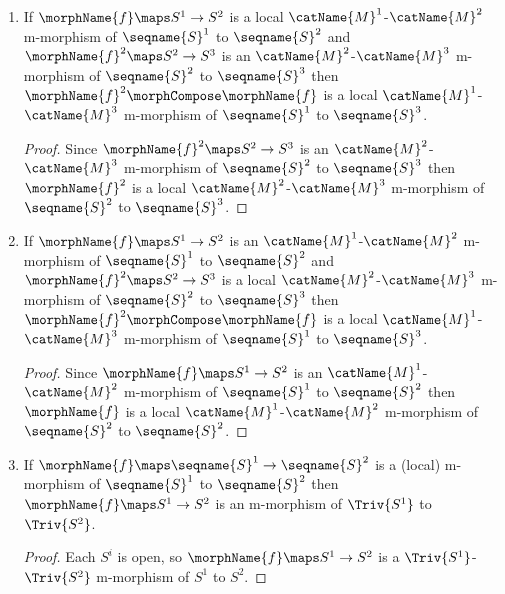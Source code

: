 \documentclass{article}
\begin{document}
\begin{corollary}
\begin{enumerate}
\begin{proof}
Since $\morphName{f} \maps S^1 \to S^2$ is an m-morphism of
$\seqname{S}^1$ to $\seqname{S}^2$ then $\morphName{f}$ is a local
m-morphism of $\seqname{S}^2$ to $\seqname{S}^2$.
\end{proof}

\item
If $\morphName{f} \maps S^1 \to S^2$ is a local
$\catName{M}^1$-$\catName{M}^2$ m-morphism of $\seqname{S}^1$ to
$\seqname{S}^2$ and $\morphName{f}^2 \maps S^2 \to S^3$ is an
$\catName{M}^2$-$\catName{M}^3$ m-morphism of $\seqname{S}^2$ to
$\seqname{S}^3$ then $\morphName{f}^2 \morphCompose \morphName{f}$ is a local
$\catName{M}^1$-$\catName{M}^3$ m-morphism of $\seqname{S}^1$ to
$\seqname{S}^3$.

\begin{proof}
Since $\morphName{f}^2 \maps S^2 \to S^3$ is an
$\catName{M}^2$-$\catName{M}^3$ m-morphism of $\seqname{S}^2$ to
$\seqname{S}^3$ then $\morphName{f}^2$ is a local
$\catName{M}^2$-$\catName{M}^3$ m-morphism of $\seqname{S}^2$ to
$\seqname{S}^3$.
\end{proof}

\item
If $\morphName{f} \maps S^1 \to S^2$ is an
$\catName{M}^1$-$\catName{M}^2$ m-morphism of $\seqname{S}^1$ to
$\seqname{S}^2$ and $\morphName{f}^2 \maps S^2 \to S^3$ is a local
$\catName{M}^2$-$\catName{M}^3$ m-morphism of $\seqname{S}^2$ to
$\seqname{S}^3$ then $\morphName{f}^2 \morphCompose \morphName{f}$ is a local
$\catName{M}^1$-$\catName{M}^3$ m-morphism of $\seqname{S}^1$ to
$\seqname{S}^3$.

\begin{proof}
Since $\morphName{f} \maps S^1 \to S^2$ is an
$\catName{M}^1$-$\catName{M}^2$ m-morphism of $\seqname{S}^1$ to
$\seqname{S}^2$ then $\morphName{f}$ is a local
$\catName{M}^1$-$\catName{M}^2$ m-morphism of $\seqname{S}^2$ to
$\seqname{S}^2$.
\end{proof}

\item
\label{M-morph:morphistrivmorph}
If $\morphName{f} \maps \seqname{S}^1 \to \seqname{S}^2$ is a (local)
m-morphism of $\seqname{S}^1$ to $\seqname{S}^2$ then
$\morphName{f} \maps S^1 \to S^2$ is an m-morphism of $\Triv{S^1}$ to
$\Triv{S^2}$.

\begin{proof}
Each $S^i$ is open, so $\morphName{f} \maps S^1 \to S^2$ is a
$\Triv{S^1}$-$\Triv{S^2}$ m-morphism of $S^1$ to $S^2$.
\end{proof}
\end{enumerate}
\end{corollary}
\end{document}
